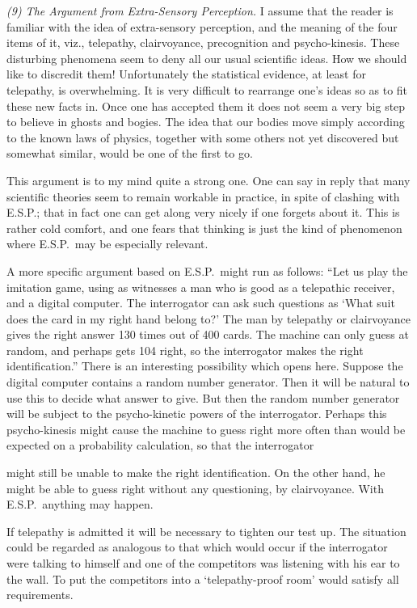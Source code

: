 \documentclass[10pt]{article} %
\begin{document}
\noindent\normalfont \textit{(9) The Argument from Extra-Sensory Perception.} I assume that the reader is familiar with the idea of extra-sensory perception, and the meaning of the four items of it, viz., telepathy, clairvoyance, precognition and psycho-kinesis. These disturbing phenomena seem to deny all our usual scientific ideas. How we should like to discredit them! Unfortunately the statistical evidence, at least for telepathy, is overwhelming. It is very difficult to rearrange one's ideas so as to fit these new facts in. Once one has accepted them it does not seem a very big step to believe in ghosts and bogies. The idea that our bodies move simply according to the known laws of physics, together with some others not yet discovered but somewhat similar, would be one of the first to go.

This argument is to my mind quite a strong one. One can say in reply that many scientific theories seem to remain workable in practice, in spite of clashing with E.S.P.; that in fact one can get along very nicely if one forgets about it. This is rather cold comfort, and one fears that thinking is just the kind of phenomenon where E.S.P.~may be especially relevant.

A more specific argument based on E.S.P.~might run as follows: ``Let us play the imitation game, using as witnesses a man who is good as a telepathic receiver, and a digital computer. The interrogator can ask such questions as `What suit does the card in my right hand belong to?' The man by telepathy or clairvoyance gives the right answer 130 times out of 400 cards. The machine can only guess at random, and perhaps gets 104 right, so the interrogator makes the right identification.'' There is an interesting possibility which opens here. Suppose the digital computer contains a random number generator. Then it will be natural to use this to decide what answer to give. But then the random number generator will be subject to the psycho-kinetic powers of the interrogator. Perhaps this psycho-kinesis might cause the machine to guess right more often than would be expected on a probability calculation, so that the interrogator

might still be unable to make the right identification. On the other hand, he might be able to guess right without any questioning, by clairvoyance. With E.S.P.~anything may happen.

If telepathy is admitted it will be necessary to tighten our test up. The situation could be regarded as analogous to that which would occur if the interrogator were talking to himself and one of the competitors was listening with his ear to the wall. To put the competitors into a `telepathy-proof room' would satisfy all requirements.
\end{document}
